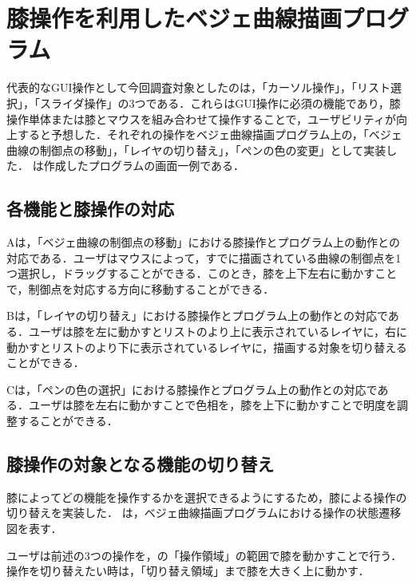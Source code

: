 \documentclass[submit, techrep]{ipsj}
\begin{document}
\section{膝操作を利用したベジェ曲線描画プログラム}
代表的なGUI操作として今回調査対象としたのは，「カーソル操作」，「リスト選択」，「スライダ操作」の3つである．これらはGUI操作に必須の機能であり，膝操作単体または膝とマウスを組み合わせて操作することで，ユーザビリティが向上すると予想した．それぞれの操作をベジェ曲線描画プログラム上の，「ベジェ曲線の制御点の移動」，「レイヤの切り替え」，「ペンの色の変更」として実装した．
は作成したプログラムの画面一例である．
\subsection{各機能と膝操作の対応}
Aは，「ベジェ曲線の制御点の移動」における膝操作とプログラム上の動作との対応である．ユーザはマウスによって，すでに描画されている曲線の制御点を1つ選択し，ドラッグすることができる．このとき，膝を上下左右に動かすことで，制御点を対応する方向に移動することができる．\par
{}Bは，「レイヤの切り替え」における膝操作とプログラム上の動作との対応である．ユーザは膝を左に動かすとリストのより上に表示されているレイヤに，右に動かすとリストのより下に表示されているレイヤに，描画する対象を切り替えることができる．\par
{}Cは，「ペンの色の選択」における膝操作とプログラム上の動作との対応である．ユーザは膝を左右に動かすことで色相を，膝を上下に動かすことで明度を調整することができる．



\subsection{膝操作の対象となる機能の切り替え}
膝によってどの機能を操作するかを選択できるようにするため，膝による操作の切り替えを実装した．
は，ベジェ曲線描画プログラムにおける操作の状態遷移図を表す．

ユーザは前述の3つの操作を，の「操作領域」の範囲で膝を動かすことで行う．操作を切り替えたい時は，「切り替え領域」まで膝を大きく上に動かす．
\end{document}
